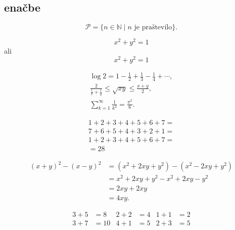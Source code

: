 \documentclass[a4paper, 10pt]{article}
\begin{document}
\subsection{enačbe} 
\begin{equation*}
    \mathcal{P} = \{ n \in \mathbb{N} \mid \text{$n$ je praštevilo} \}.
\end{equation*}

\begin{equation*}
    x^2 + y^2 = 1
\end{equation*}
  ali
\begin{equation}
    \label{eq:1}
    x^2 + y^2 = 1
\end{equation}

\begin{gather*}
    \log 2 = 1 - \frac{1}{2} + \frac{1}{3} - \frac{1}{4} + \cdots, \\
    \frac{2}{\frac{1}{x} + \frac{1}{y}} \leq \sqrt{x y} \leq \frac{x + y}{2}, \\
    \sum_{k = 1}^\infty \frac{1}{k^2} = \frac{\pi^2}{6}.
\end{gather*}

\begin{multline*}
  1 + 2 + 3 + 4 + 5 + 6 + 7  = \\ 
  7 + 6 + 5 + 4 + 3 + 2 + 1 = \\
  1 + 2 + 3 + 4 + 5 + 6 + 7 = \\
  = 28
\end{multline*}

\begin{align*}
    (x + y)^2 - (x - y)^2
    &= (x^2 + 2 x y + y^2) - (x^2 - 2 x y + y^2) \\
    &= x^2 + 2 x y + y^2 - x^2 + 2 x y - y^2 \\
    &= 2 x y + 2 x y \\
    &= 4 x y.
\end{align*}

\begin{align*}
    3 + 5 &= 8
    &
    2 + 2 &= 4
    &
    1 + 1 &= 2
    \\
    3 + 7 &= 10
    &
    4 + 1 &= 5
    &
    2 + 3 &= 5
\end{align*}
\end{document}
